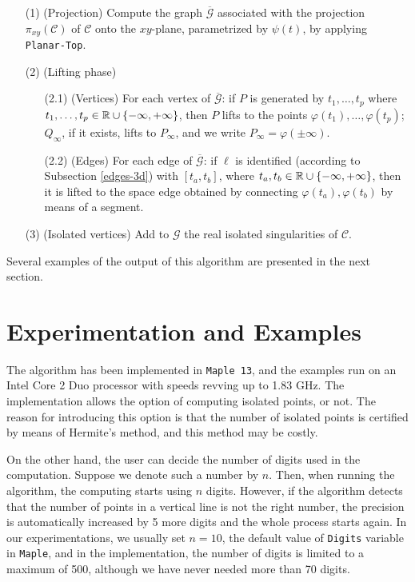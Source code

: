 \documentclass{elsart}
\begin{document}
\begin{itemize}
\item [(1)] (Projection) Compute the graph $\overline{\mathcal G}$ associated with the projection $\pi_{xy}({\mathcal C})$ of ${\mathcal C}$ onto the $xy$-plane, parametrized by $\psi(t)$, by applying {\tt Planar-Top}.
    \item [(2)] (Lifting phase)
    \begin{itemize}
    \item [(2.1)] (Vertices) For each vertex of $\overline{\mathcal G}$: if $P$ is generated by $t_1,\ldots,t_p$ where $t_1,\ldots,t_p\in {\Bbb R}\cup \{-\infty,+\infty\}$, then $P$ lifts to the points $\varphi(t_1),\ldots,\varphi(t_p)$;  $Q_{\infty}$, if it exists, lifts to $P_{\infty}$, and we write $P_{\infty}=\varphi(\pm \infty)$.
        \item [(2.2)] (Edges) For each edge of $\overline{\mathcal G}$: if $\ell$ is identified (according to Subsection \ref{edges-3d}) with $[t_a,t_b]$, where $t_a,t_b\in {\Bbb R}\cup \{-\infty,+\infty\}$, then it is lifted to the space edge obtained by connecting $\varphi(t_a),\varphi(t_b)$ by means of a segment.
            \end{itemize}
    \item [(3)] (Isolated vertices) Add to ${\mathcal G}$ the real isolated singularities of ${\mathcal C}$.
    \end{itemize}

 Several examples of the output of this algorithm are presented in the next section.



\section{Experimentation and Examples} \label{Examp}

The algorithm has been implemented in \texttt{Maple 13}, and the examples
run on an Intel Core 2 Duo processor with speeds revving up to
1.83 GHz. The implementation allows the option of computing
isolated points, or not. The reason for introducing this option is
that the number of isolated points is certified by means of
Hermite's method, and this method may be costly.

On the other hand, the user can decide the number of digits used
in the computation. Suppose we denote such a number by $n$. Then,
when running the algorithm, the computing starts using $n$ digits.
However, if the algorithm detects that the number of points in a
vertical line is not the right number, the precision is
automatically increased by 5 more digits and the whole process
starts again. In our experimentations, we usually set $n=10$, the
default value of \texttt{Digits} variable in \texttt{Maple}, and
in the implementation, the number of digits is limited to a
maximum of 500, although we have never needed more than 70 digits.
\end{document}
